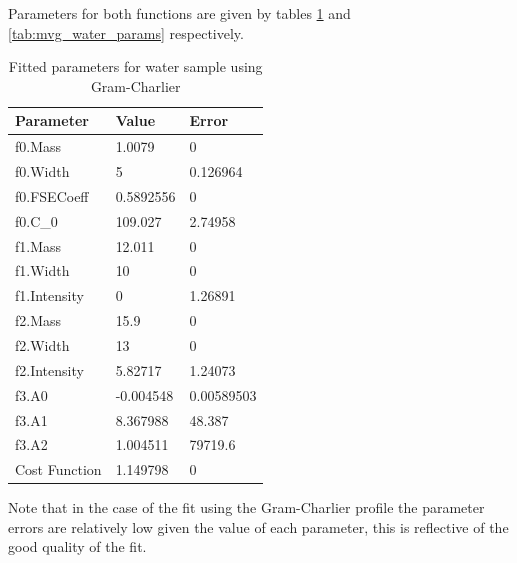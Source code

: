 \documentclass[a4paper]{article}
\begin{document}
Parameters for both functions are given by tables \ref{tab:gc_water_params} and
\ref{tab:mvg_water_params} respectively.

\begin{table}[h!]
  \centering
  \begin{tabular}{lll}
    \toprule
    Parameter     & Value     & Error      \\
    \midrule
    f0.Mass       & 1.0079    & 0          \\
    f0.Width      & 5         & 0.126964   \\
    f0.FSECoeff   & 0.5892556 & 0          \\
    f0.C\_0       & 109.027   & 2.74958    \\
    f1.Mass       & 12.011    & 0          \\
    f1.Width      & 10        & 0          \\
    f1.Intensity  & 0         & 1.26891    \\
    f2.Mass       & 15.9      & 0          \\
    f2.Width      & 13        & 0          \\
    f2.Intensity  & 5.82717   & 1.24073    \\
    f3.A0         & -0.004548 & 0.00589503 \\
    f3.A1         & 8.367988  & 48.387     \\
    f3.A2         & 1.004511  & 79719.6    \\
    Cost Function & 1.149798  & 0          \\
    \bottomrule
  \end{tabular}
  \caption{Fitted parameters for water sample using Gram-Charlier}
  \label{tab:gc_water_params}
\end{table}
\FloatBarrier

Note that in the case of the fit using the Gram-Charlier profile the parameter
errors are relatively low given the value of each parameter, this is reflective
of the good quality of the fit.
\end{document}
